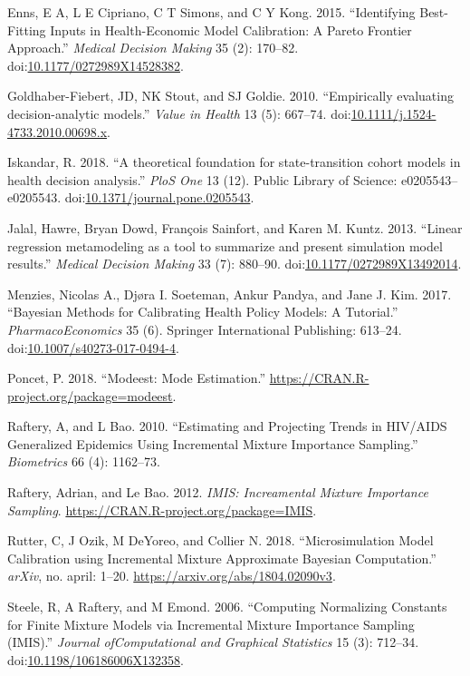 \documentclass[]{article}
\begin{document}
\hypertarget{ref-Enns2015}{}
Enns, E A, L E Cipriano, C T Simons, and C Y Kong. 2015. ``Identifying
Best-Fitting Inputs in Health-Economic Model Calibration: A Pareto
Frontier Approach.'' \emph{Medical Decision Making} 35 (2): 170--82.
doi:\href{https://doi.org/10.1177/0272989X14528382}{10.1177/0272989X14528382}.

\hypertarget{ref-Goldhaber_Fiebert2010}{}
Goldhaber-Fiebert, JD, NK Stout, and SJ Goldie. 2010. ``Empirically
evaluating decision-analytic models.'' \emph{Value in Health} 13 (5):
667--74.
doi:\href{https://doi.org/10.1111/j.1524-4733.2010.00698.x}{10.1111/j.1524-4733.2010.00698.x}.

\hypertarget{ref-Iskandar2018}{}
Iskandar, R. 2018. ``A theoretical foundation for state-transition
cohort models in health decision analysis.'' \emph{PloS One} 13 (12).
Public Library of Science: e0205543--e0205543.
doi:\href{https://doi.org/10.1371/journal.pone.0205543}{10.1371/journal.pone.0205543}.

\hypertarget{ref-Jalal2013}{}
Jalal, Hawre, Bryan Dowd, François Sainfort, and Karen M. Kuntz. 2013.
``Linear regression metamodeling as a tool to summarize and present
simulation model results.'' \emph{Medical Decision Making} 33 (7):
880--90.
doi:\href{https://doi.org/10.1177/0272989X13492014}{10.1177/0272989X13492014}.

\hypertarget{ref-Menzies2017}{}
Menzies, Nicolas A., Djøra I. Soeteman, Ankur Pandya, and Jane J. Kim.
2017. ``Bayesian Methods for Calibrating Health Policy Models: A
Tutorial.'' \emph{PharmacoEconomics} 35 (6). Springer International
Publishing: 613--24.
doi:\href{https://doi.org/10.1007/s40273-017-0494-4}{10.1007/s40273-017-0494-4}.

\hypertarget{ref-modeest}{}
Poncet, P. 2018. ``Modeest: Mode Estimation.''
\url{https://CRAN.R-project.org/package=modeest}.

\hypertarget{ref-Raftery2010}{}
Raftery, A, and L Bao. 2010. ``Estimating and Projecting Trends in
HIV/AIDS Generalized Epidemics Using Incremental Mixture Importance
Sampling.'' \emph{Biometrics} 66 (4): 1162--73.

\hypertarget{ref-IMIS}{}
Raftery, Adrian, and Le Bao. 2012. \emph{IMIS: Increamental Mixture
Importance Sampling}. \url{https://CRAN.R-project.org/package=IMIS}.

\hypertarget{ref-Rutter2018}{}
Rutter, C, J Ozik, M DeYoreo, and Collier N. 2018. ``Microsimulation
Model Calibration using Incremental Mixture Approximate Bayesian
Computation.'' \emph{arXiv}, no. april: 1--20.
\url{https://arxiv.org/abs/1804.02090v3}.

\hypertarget{ref-Steele2006}{}
Steele, R, A Raftery, and M Emond. 2006. ``Computing Normalizing
Constants for Finite Mixture Models via Incremental Mixture Importance
Sampling (IMIS).'' \emph{Journal ofComputational and Graphical
Statistics} 15 (3): 712--34.
doi:\href{https://doi.org/10.1198/106186006X132358}{10.1198/106186006X132358}.
\end{document}
